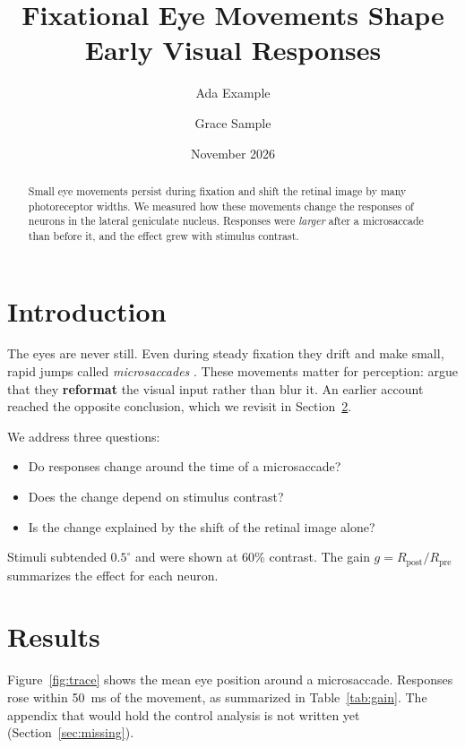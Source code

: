 \documentclass[11pt]{article}
\title{Fixational Eye Movements Shape Early Visual Responses}
\author{Ada Example \and Grace Sample}
\date{November 2026}
\newcommand{\vdeg}[1]{\ensuremath{#1^{\circ}}}
\begin{document}
\maketitle

\begin{abstract}
Small eye movements persist during fixation and shift the retinal image by
many photoreceptor widths. We measured how these movements change the
responses of neurons in the lateral geniculate nucleus. Responses were
\emph{larger} after a microsaccade than before it, and the effect grew with
stimulus contrast.
\end{abstract}

\section{Introduction}
\label{sec:intro}

The eyes are never still. Even during steady fixation they drift and make
small, rapid jumps called \emph{microsaccades} \parencite{rolfs2009}. These
movements matter for perception: \textcite{rucci2015} argue that they
\textbf{reformat} the visual input rather than blur it. An earlier account
\cite{missing2019} reached the opposite conclusion, which we revisit in
Section~\ref{sec:results}.

We address three questions:
\begin{itemize}
  \item Do responses change around the time of a microsaccade?
  \item Does the change depend on stimulus contrast?
  \item Is the change explained by the shift of the retinal image alone?
\end{itemize}

Stimuli subtended \vdeg{0.5} and were shown at 60\% contrast. The gain
$g = R_{\text{post}} / R_{\text{pre}}$ summarizes the effect for each neuron.



\section{Results}
\label{sec:results}

Figure~\ref{fig:trace} shows the mean eye position around a microsaccade.
Responses rose within 50~ms of the movement, as summarized in
Table~\ref{tab:gain}. The appendix that would hold the control analysis is
not written yet (Section~\ref{sec:missing}).
\end{document}
